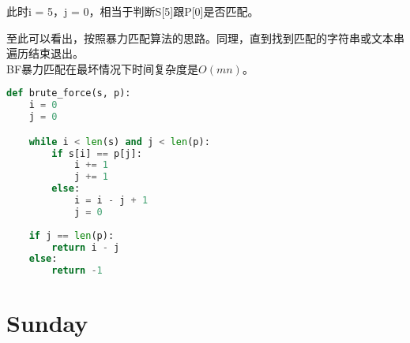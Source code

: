 此时i = 5，j = 0，相当于判断S[5]跟P[0]是否匹配。

\begin{table}[H]
	\centering
\end{table}

至此可以看出，按照暴力匹配算法的思路。同理，直到找到匹配的字符串或文本串遍历结束退出。\\

BF暴力匹配在最坏情况下时间复杂度是$ O(mn) $。\\


\begin{lstlisting}[language=Python]
def brute_force(s, p):
    i = 0
    j = 0

    while i < len(s) and j < len(p):
        if s[i] == p[j]:
            i += 1
            j += 1
        else:
            i = i - j + 1
            j = 0
    
    if j == len(p):
        return i - j
    else:
        return -1
\end{lstlisting}

\newpage

\section{Sunday}

